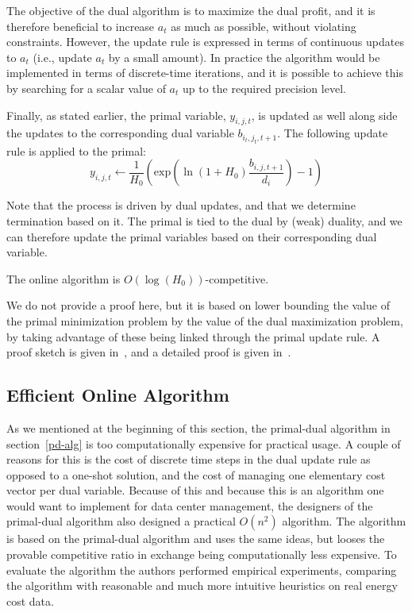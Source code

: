 The objective of the dual algorithm is to maximize the dual profit, and it is therefore beneficial to increase $a_t$ as much as possible, without violating constraints.
However, the update rule is expressed in terms of continuous updates to $a_t$ (i.e., update $a_t$ by a small amount).
In practice the algorithm would be implemented in terms of discrete-time iterations, and it is possible to achieve this by searching for a scalar value of $a_t$ up to the required precision level.

Finally, as stated earlier, the primal variable, $y_{i,j,t}$, is updated as well along side the updates to the corresponding dual variable $b_{i_t,j_t,t+1}$.
The following update rule is applied to the primal:
\[
 y_{i,j,t} \leftarrow \frac{1}{H_0}\left(\textrm{exp}\left(\ln(1+H_0) \frac{b_{i,j,t+1}}{d_i}\right)-1\right)
\]

Note that the process is driven by dual updates, and that we determine termination based on it.
The primal is tied to the dual by (weak) duality, and we can therefore update the primal variables based on their corresponding dual variable.

\begin{theorem}
 The online algorithm is $O(\log(H_0))$-competitive.
\end{theorem}

We do not provide a proof here, but it is based on lower bounding the value of the primal minimization problem by the value of the dual maximization problem, by taking advantage of these being linked through the primal update rule.
A proof sketch is given in~\cite{buchbinder11:job-migration-techreport}, and a detailed proof is given in~\cite{buchbinder11:job-migration}.

\subsection{Efficient Online Algorithm}

As we mentioned at the beginning of this section, the primal-dual algorithm in section~\ref{pd-alg} is too computationally expensive for practical usage.
A couple of reasons for this is the cost of discrete time steps in the dual update rule as opposed to a one-shot solution, and the cost of managing one elementary cost vector per dual variable.
Because of this and because this is an algorithm one would want to implement for data center management, the designers of the primal-dual algorithm also designed a practical $O(n^2)$ algorithm.
The algorithm is based on the primal-dual algorithm and uses the same ideas, but looses the provable competitive ratio in exchange being computationally less expensive.
To evaluate the algorithm the authors performed empirical experiments, comparing the algorithm with reasonable and much more intuitive heuristics on real energy cost data.


